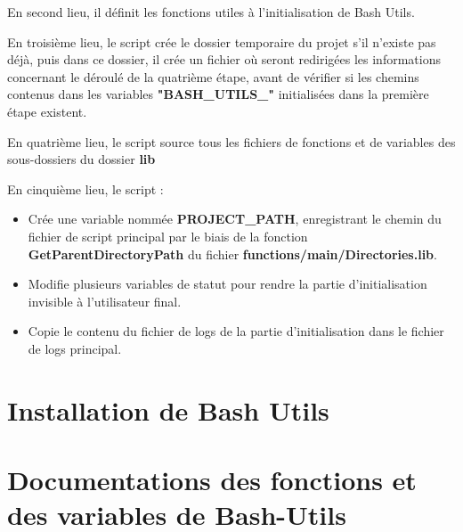 \documentclass[a4paper,10pt]{article}
\begin{document}
En second lieu, il définit les fonctions utiles à l'initialisation de Bash Utils.

En troisième lieu, le script crée le dossier temporaire du projet s'il n'existe pas déjà, puis dans ce dossier, il crée un fichier où seront redirigées les informations concernant le déroulé de la quatrième étape, avant de vérifier si les chemins contenus dans les variables \textbf{"BASH\_UTILS\_"} initialisées dans la première étape existent.

En quatrième lieu, le script source tous les fichiers de fonctions et de variables des sous-dossiers du dossier \textbf{lib}

En cinquième lieu, le script :
\begin{itemize}
    \item Crée une variable nommée \textbf{PROJECT\_PATH}, enregistrant le chemin du fichier de script principal par le biais de la fonction \textbf{GetParentDirectoryPath} du fichier \textbf{functions/main/Directories.lib}. 
    
    \item Modifie plusieurs variables de statut pour rendre la partie d'initialisation invisible à l'utilisateur final.
    
    \item Copie le contenu du fichier de logs de la partie d'initialisation dans le fichier de logs principal.
\end{itemize}



\section{Installation de Bash Utils}

\section{Documentations des fonctions et des variables de Bash-Utils}
\end{document}
